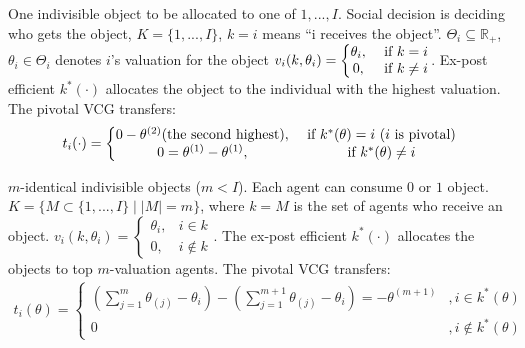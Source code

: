 \documentclass[11pt]{elegantbook}
\begin{document}
\begin{example}
    One indivisible object to be allocated to one of $1,...,I$. Social decision is deciding who gets the object, $K=\{1,...,I\}$, $k=i$ means ``i receives the object''. $\Theta_i\subseteq \mathbb{R}_+$, $\theta_i\in\Theta_i$ denotes $i$'s valuation for the object $v_i(k,\theta_i)=\left\{\begin{matrix}
        \theta_i,& \textnormal{ if }k=i\\
        0,& \textnormal{ if }k\neq i
    \end{matrix}\right.$.
    Ex-post efficient $k^*(\cdot)$ allocates the object to the individual with the highest valuation. The pivotal VCG transfers:
    \begin{equation}
        \begin{aligned}
            t_i(\cdot)=\left\{\begin{matrix}
                0-\theta^{(2)}\textnormal{(the second highest)},& \textnormal{ if }k^*(\theta)=i \textnormal{ ($i$ is pivotal)}\\
                0=\theta^{(1)}-\theta^{(1)},&\textnormal{ if }k^*(\theta)\neq i
            \end{matrix}\right.
        \end{aligned}
        \nonumber
    \end{equation}
\end{example}


\begin{example}
    $m$-identical indivisible objects ($m<I$). Each agent can consume $0$ or $1$ object. $K=\{M\subset \{1,...,I\}\mid |M|=m\}$, where $k=M$ is the set of agents who receive an object. $v_i(k,\theta_i)=\left\{\begin{matrix}
        \theta_i,&i\in k\\
        0,&i\notin k
    \end{matrix}\right.$. The ex-post efficient $k^*(\cdot)$ allocates the objects to top $m$-valuation agents. The pivotal VCG transfers:
    \begin{equation}
        \begin{aligned}
            t_i(\theta)=\left\{\begin{matrix}
                \left(\sum_{j=1}^m\theta_{(j)}-\theta_i\right)-\left(\sum_{j=1}^{m+1}\theta_{(j)}-\theta_i\right)=-\theta^{(m+1)}&,i\in k^*(\theta)\\
                0&,i\notin k^*(\theta)
            \end{matrix}\right.
        \end{aligned}
        \nonumber
    \end{equation}
\end{example}
\end{document}
